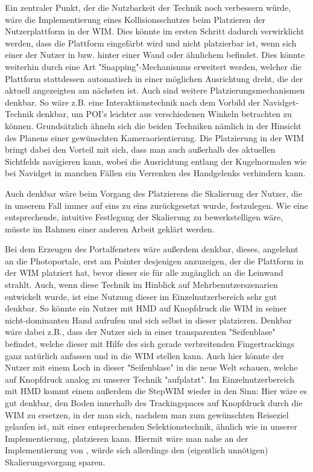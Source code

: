 Ein zentraler Punkt, der die Nutzbarkeit der Technik noch verbessern würde, wäre die Implementierung eines Kollisionsschutzes beim Platzieren der Nutzerplattform in der WIM. Dies könnte im ersten Schritt dadurch verwirklicht werden, dass die Plattform eingefärbt wird und nicht platzierbar ist, wenn sich einer der Nutzer in bzw. hinter einer Wand oder ähnlichem befindet. Dies könnte weiterhin durch eine Art "Snapping"-Mechanismus erweitert werden, welcher die Plattform stattdessen automatisch in einer möglichen Ausrichtung dreht, die der aktuell angezeigten am nächsten ist.
Auch sind weitere Platzierungsmechanismen denkbar. So wäre z.B. eine Interaktionstechnik nach dem Vorbild der Navidget-Technik \cite{HACHET2009225} denkbar, um POI's leichter aus verschiedenen Winkeln betrachten zu können. Grundsätzlich ähneln sich die beiden Techniken nämlich in der Hinsicht des Planens einer gewünschten Kameraorientierung. Die Platzierung in der WIM bringt dabei den Vorteil mit sich, dass man auch außerhalb des aktuellen Sichtfelds navigieren kann, wobei die Ausrichtung entlang der Kugelnormalen wie bei Navidget in manchen Fällen ein Verrenken des Handgelenks verhindern kann.

Auch denkbar wäre beim Vorgang des Platzierens die Skalierung der Nutzer, die in unserem Fall immer auf eins zu eins zurückgesetzt wurde, festzulegen. Wie eine entsprechende, intuitive Festlegung der Skalierung zu bewerkstelligen wäre, müsste im Rahmen einer anderen Arbeit geklärt werden.

Bei dem Erzeugen des Portalfensters wäre außerdem denkbar, dieses, angelehnt an die Photoportale, erst am Pointer desjenigen anzuzeigen, der die Plattform in der WIM platziert hat, bevor dieser sie für alle zugänglich an die Leinwand strahlt.
Auch, wenn diese Technik im Hinblick auf Mehrbenutzerszenarien entwickelt wurde, ist eine Nutzung dieser im Einzelnutzerbereich sehr gut denkbar. So könnte ein Nutzer mit HMD auf Knopfdruck die WIM in seiner nicht-dominanten Hand aufrufen und sich selbst in dieser platzieren. Denkbar wäre dabei z.B., dass der Nutzer sich in einer transparenten "Seifenblase" befindet, welche dieser mit Hilfe des sich gerade verbreitenden Fingertrackings ganz natürlich anfassen und in die WIM stellen kann. Auch hier könnte der Nutzer mit einem Loch in dieser "Seifenblase" in die neue Welt schauen, welche auf Knopfdruck analog zu unserer Technik "aufplatzt". Im Einzelnutzerbereich mit HMD kommt einem außerdem die StepWIM\cite{Stoakley2010VirtualWIMb} wieder in den Sinn:
Hier wäre es gut denkbar, den Boden innerhalb des Trackingspaces auf Knopfdruck durch die WIM zu ersetzen, in der man sich, nachdem man zum gewünschten Reiseziel gelaufen ist, mit einer entsprechenden Selektionstechnik, ähnlich wie in unserer Implementierung, platzieren kann.
Hiermit wäre man nahe an der Implementierung von \cite{Krekhov2018GulliVRb}, würde sich allerdings den (eigentlich unnötigen) Skalierungsvorgang sparen.

